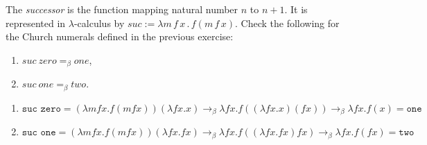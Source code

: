 \begin{problem}{1.11}
    The \emph{successor} is the function mapping natural number \(n\) to \(n+1\). It is represented in \(\lambda\)-calculus by \(\mathit{suc} := \lambda m\,f\,x\,.\, f(m\,f\,x)\). Check the following for the Church numerals defined in the previous exercise:
    \begin{enumerate}[label=$(\alph*)$]
        \item \(\mathit{suc}\ \mathit{zero} =_{\beta} \mathit{one}\),
        \item \(\mathit{suc}\ \mathit{one} =_{\beta} \mathit{two}\).
    \end{enumerate}
\end{problem}

\begin{solution}
    \begin{enumerate}[label=$(\alph*)$]
        \item $ \texttt{suc zero} = (\lambda mfx.f(mfx))(\lambda fx.x) \to_\beta \lambda fx.f((\lambda fx.x)(fx)) \to_\beta \lambda fx.f(x) = \texttt{one} $
        \item $ \texttt{suc one} = (\lambda mfx.f(mfx))(\lambda fx.fx) \to_\beta \lambda fx.f((\lambda fx.fx)fx) \to_\beta \lambda fx.f(fx) = \texttt{two} $
    \end{enumerate}
\end{solution}